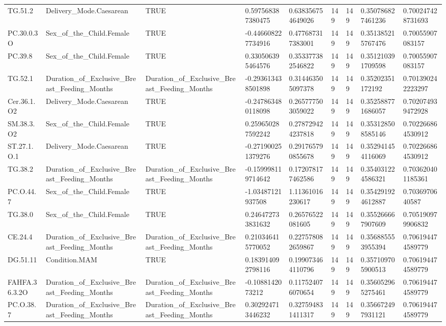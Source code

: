 \begin{longtable}{lllllllll}
TG.51.2 & Delivery\_Mode.Caesarean & TRUE & 0.597568387380475 & 0.638356754649026 & 149 & 149 & 0.350786827461236 & 0.700247428731693 \\
PC.30.0.3O & Sex\_of\_the\_Child.Female & TRUE & -0.446608227734916 & 0.477687317383001 & 149 & 149 & 0.351385215767476 & 0.70055907083157 \\
PC.39.8 & Sex\_of\_the\_Child.Female & TRUE & 0.330506395464576 & 0.353377382546822 & 149 & 149 & 0.351210391709598 & 0.70055907083157 \\
TG.52.1 & Duration\_of\_Exclusive\_Breast\_Feeding\_Months & Duration\_of\_Exclusive\_Breast\_Feeding\_Months & -0.293613438501898 & 0.314463505097378 & 149 & 149 & 0.35202351172192 & 0.701390242223297 \\
Cer.36.1.O2 & Delivery\_Mode.Caesarean & TRUE & -0.247863480118098 & 0.265777503059022 & 149 & 149 & 0.352588771686057 & 0.702074939472928 \\
SM.38.3.O2 & Sex\_of\_the\_Child.Female & TRUE & 0.259650287592242 & 0.278729424237818 & 149 & 149 & 0.353128508585146 & 0.702266864530912 \\
ST.27.1.O.1 & Delivery\_Mode.Caesarean & TRUE & -0.271900251379276 & 0.291765790855678 & 149 & 149 & 0.352941454116069 & 0.702266864530912 \\
TG.38.2 & Duration\_of\_Exclusive\_Breast\_Feeding\_Months & Duration\_of\_Exclusive\_Breast\_Feeding\_Months & -0.159998119714642 & 0.172078177462586 & 149 & 149 & 0.354031224586321 & 0.703620401185361 \\
PC.O.44.7 & Sex\_of\_the\_Child.Female & TRUE & -1.03487121937508 & 1.11361016230617 & 149 & 149 & 0.354291924612887 & 0.7036970640587 \\
TG.38.0 & Sex\_of\_the\_Child.Female & TRUE & 0.246472733831632 & 0.26576522081605 & 149 & 149 & 0.355266667907609 & 0.705190979906832 \\
CE.24.4 & Duration\_of\_Exclusive\_Breast\_Feeding\_Months & Duration\_of\_Exclusive\_Breast\_Feeding\_Months & 0.210346415770052 & 0.227578082659867 & 149 & 149 & 0.356885553955394 & 0.706194474589779 \\
DG.51.11 & Condition.MAM & TRUE & 0.183914092798116 & 0.199073464110796 & 149 & 149 & 0.357109705900513 & 0.706194474589779 \\
FAHFA.36.3.2O & Duration\_of\_Exclusive\_Breast\_Feeding\_Months & Duration\_of\_Exclusive\_Breast\_Feeding\_Months & -0.1088142073212 & 0.117524076070654 & 149 & 149 & 0.356052965275461 & 0.706194474589779 \\
PC.O.38.7 & Duration\_of\_Exclusive\_Breast\_Feeding\_Months & Duration\_of\_Exclusive\_Breast\_Feeding\_Months & 0.302924713446232 & 0.327594831411317 & 149 & 149 & 0.356672497931121 & 0.706194474589779 \\

\end{longtable}
